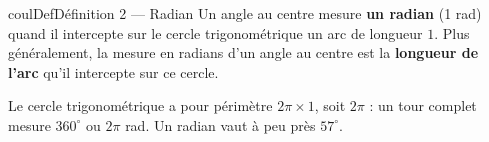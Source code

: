 \documentclass[11pt,a4paper]{article}
\makeatletter
\newcounter{lycee@signet}
\newcommand{\signet}[3][]{\stepcounter{lycee@signet}%
  \edef\lycee@dest{\if\relax\detokenize{#1}\relax
    signet.\arabic{lycee@signet}\else#1\fi}%
  \hypertarget{\lycee@dest}{}\bookmark[level=#2,dest=\lycee@dest]{#3}}
\newenvironment{definitionbox}[1][Définition]%
  {\begin{boitecours}[phantom={\signet{2}{#1}}]{coulDef}{#1}}{\end{boitecours}}
\makeatother
\begin{document}
\begin{definitionbox}[Définition 2 --- Radian]
Un angle au centre mesure \textbf{un radian} (1 rad) quand il intercepte sur le cercle
trigonométrique un arc de longueur $1$. Plus généralement, la mesure en radians d'un
angle au centre est la \textbf{longueur de l'arc} qu'il intercepte sur ce cercle.

\smallskip
Le cercle trigonométrique a pour périmètre $2\pi\times 1$, soit $2\pi$ : un tour complet
mesure $360^{\circ}$ ou $2\pi$ rad. Un radian vaut à peu près $57^{\circ}$.

\medskip
\begin{minipage}[t]{0.24\linewidth}\centering
{}
\end{minipage}\hfill
\begin{minipage}[t]{0.24\linewidth}\centering
{}
\end{minipage}\hfill
\begin{minipage}[t]{0.24\linewidth}\centering
{}
\end{minipage}\hfill
\begin{minipage}[t]{0.24\linewidth}\centering
{}
\end{minipage}
\end{definitionbox}
\end{document}
